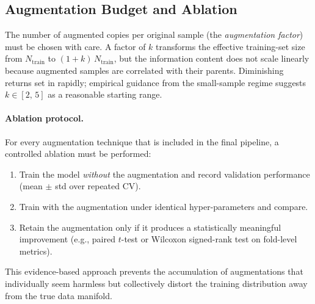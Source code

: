 \subsection{Augmentation Budget and Ablation}
\label{sec:augment:ablation}

The number of augmented copies per original sample (the
\emph{augmentation factor}) must be chosen with care.  A factor of
$k$ transforms the effective training-set size from $N_{\text{train}}$
to $(1+k)\,N_{\text{train}}$, but the information content does not
scale linearly because augmented samples are correlated with their
parents.  Diminishing returns set in rapidly; empirical guidance from
the small-sample regime suggests $k \in [2,\,5]$ as a reasonable
starting range.

\paragraph{Ablation protocol.}
For every augmentation technique that is included in the final pipeline,
a controlled ablation must be performed:
\begin{enumerate}
  \item Train the model \emph{without} the augmentation and record
        validation performance (mean $\pm$ std over repeated CV).
  \item Train with the augmentation under identical hyper-parameters and
        compare.
  \item Retain the augmentation only if it produces a statistically
        meaningful improvement (e.g., paired $t$-test or Wilcoxon
        signed-rank test on fold-level metrics).
\end{enumerate}

This evidence-based approach prevents the accumulation of augmentations
that individually seem harmless but collectively distort the training
distribution away from the true data manifold.
